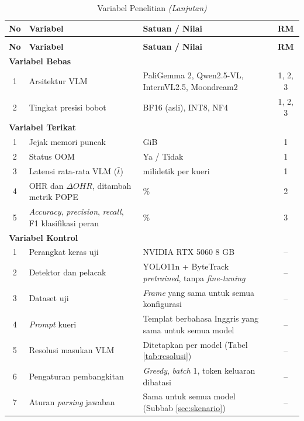 {\renewcommand{\arraystretch}{1.3}
\begin{longtable}{|c|>{\raggedright\arraybackslash}p{5.6cm}|>{\raggedright\arraybackslash}p{5.2cm}|c|}
    \caption{Variabel Penelitian}
    \label{tab:variabel} \\
    \hline
    \textbf{No} & \textbf{Variabel} & \textbf{Satuan / Nilai} & \textbf{RM} \\
    \hline
    \endfirsthead
    \caption[]{Variabel Penelitian \textit{(Lanjutan)}} \\
    \hline
    \textbf{No} & \textbf{Variabel} & \textbf{Satuan / Nilai} & \textbf{RM} \\
    \hline
    \endhead
    \multicolumn{4}{|l|}{\textbf{Variabel Bebas}} \\
    \hline
    1 & Arsitektur VLM & PaliGemma 2, Qwen2.5-VL, InternVL2.5, Moondream2 & 1, 2, 3 \\
    \hline
    2 & Tingkat presisi bobot & BF16 (asli), INT8, NF4 & 1, 2, 3 \\
    \hline
    \multicolumn{4}{|l|}{\textbf{Variabel Terikat}} \\
    \hline
    1 & Jejak memori puncak & GiB & 1 \\
    \hline
    2 & Status OOM & Ya / Tidak & 1 \\
    \hline
    3 & Latensi rata-rata VLM ($\bar{t}$) & milidetik per kueri & 1 \\
    \hline
    4 & OHR dan $\Delta OHR$, ditambah metrik POPE & \% & 2 \\
    \hline
    5 & \textit{Accuracy}, \textit{precision}, \textit{recall}, F1 klasifikasi peran & \% & 3 \\
    \hline
    \multicolumn{4}{|l|}{\textbf{Variabel Kontrol}} \\
    \hline
    1 & Perangkat keras uji & NVIDIA RTX 5060 8 GB & -- \\
    \hline
    2 & Detektor dan pelacak & YOLO11n + ByteTrack \textit{pretrained}, tanpa \textit{fine-tuning} & -- \\
    \hline
    3 & Dataset uji & \textit{Frame} yang sama untuk semua konfigurasi & -- \\
    \hline
    4 & \textit{Prompt} kueri & Templat berbahasa Inggris yang sama untuk semua model & -- \\
    \hline
    5 & Resolusi masukan VLM & Ditetapkan per model (Tabel \ref{tab:resolusi}) & -- \\
    \hline
    6 & Pengaturan pembangkitan & \textit{Greedy}, \textit{batch} 1, token keluaran dibatasi & -- \\
    \hline
    7 & Aturan \textit{parsing} jawaban & Sama untuk semua model (Subbab \ref{sec:skenario}) & -- \\
    \hline
\end{longtable}
}

